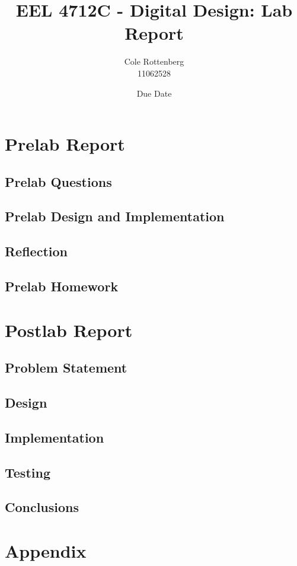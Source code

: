 \documentclass{article}
\title{EEL 4712C - Digital Design: Lab Report}
\author{Cole Rottenberg \\ 11062528}
\date{Due Date}
\begin{document}
\maketitle

\section*{Prelab Report}

\subsection*{Prelab Questions}

\subsection*{Prelab Design and Implementation}

\subsection*{Reflection}

\subsection*{Prelab Homework}

\section*{Postlab Report}

\subsection*{Problem Statement}

\subsection*{Design}

\subsection*{Implementation}

\subsection*{Testing}

\subsection*{Conclusions}

\section*{Appendix}
\end{document}
